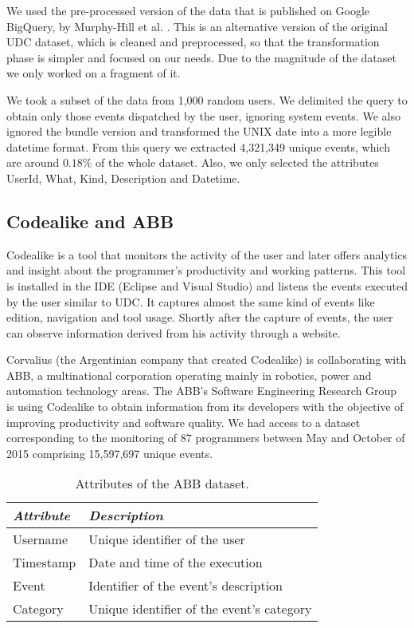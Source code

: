 We used the pre-processed version of the data that is published on Google BigQuery, by Murphy-Hill et al. \cite{SnipesETALASD}. This is an alternative version of the original UDC dataset, which is cleaned and preprocessed, so that the transformation phase is simpler and focused on our needs. Due to the magnitude of the dataset we only worked on a fragment of it. 

We took a subset of the data from 1,000 random users. We delimited the query to obtain only those events dispatched by the user, ignoring system events. We also ignored the bundle version and transformed the UNIX date into a more legible datetime format. From this query we extracted 4,321,349 unique events, which are around $0.18\%$ of the whole dataset. Also, we only selected the attributes UserId, What, Kind, Description and Datetime.

\subsection{Codealike and ABB}
Codealike \cite{CLQ15} is a tool that monitors the activity of the user and later offers analytics and insight about the programmer's productivity and working patterns. This tool is installed in the IDE (Eclipse and Visual Studio) and listens the events executed by the user similar to UDC. It captures almost the same kind of events like edition, navigation and tool usage. Shortly after the capture of events, the user can observe information derived from his activity through a website.

Corvalius (the Argentinian company that created Codealike) is collaborating with ABB, a multinational corporation operating mainly in robotics, power and automation technology areas. The ABB's Software Engineering Research Group is using Codealike to obtain information from its developers with the objective of improving productivity and software quality. We had access to a dataset corresponding to the monitoring of 87 programmers between May and October of 2015 comprising 15,597,697 unique events.

\begin{table}[ht!]
	\small
	\caption{Attributes of the ABB dataset. }
	\label{tbl:att_abb}
	\centering
	\begin{tabular}{p{2.5cm}|p{7cm}} 
		\hline 
		\emph{Attribute} & \emph{Description} \\  
		\hline 
		\hline 
		Username &  Unique identifier of the user \\
		\hline
		Timestamp & Date and time of the execution  \\
		\hline
		Event & Identifier of the event's description  \\
		\hline
		Category & Unique identifier of the event's category \\
		\hline
	\end{tabular}
	
\end{table}


